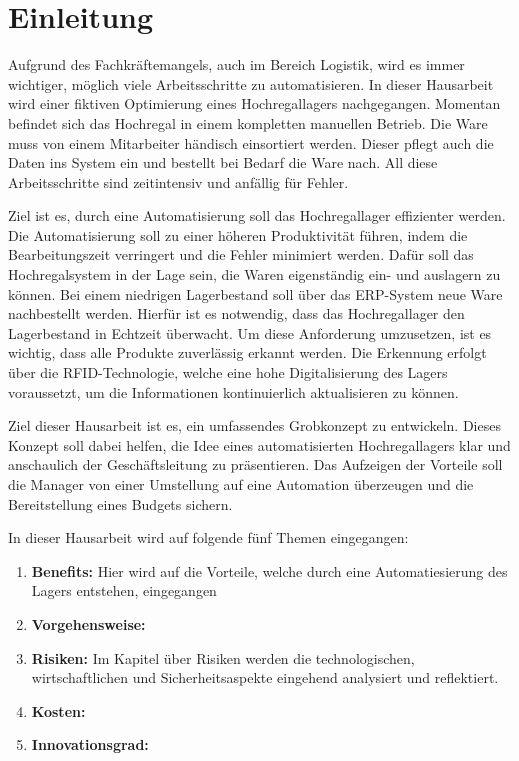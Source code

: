 \chapter{Einleitung}

Aufgrund des Fachkräftemangels, auch im Bereich Logistik, wird es immer wichtiger, möglich viele Arbeitsschritte zu automatisieren.
In dieser Hausarbeit wird einer fiktiven Optimierung eines Hochregallagers nachgegangen. 
Momentan befindet sich das Hochregal in einem kompletten manuellen Betrieb. Die Ware muss von einem Mitarbeiter händisch einsortiert werden. Dieser pflegt auch die Daten ins System ein und bestellt bei Bedarf die Ware nach.
All diese Arbeitsschritte sind zeitintensiv und anfällig für Fehler.

Ziel ist es, durch eine Automatisierung soll das Hochregallager effizienter werden. Die Automatisierung soll zu einer höheren Produktivität führen, indem die Bearbeitungszeit verringert und die Fehler minimiert werden. Dafür soll das Hochregalsystem in der Lage sein, die Waren eigenständig ein- und auslagern zu können. 
Bei einem niedrigen Lagerbestand soll über das ERP-System neue Ware nachbestellt werden. Hierfür ist es notwendig, dass das Hochregallager den Lagerbestand in Echtzeit überwacht. Um diese Anforderung umzusetzen, ist es wichtig, dass alle Produkte zuverlässig erkannt werden. Die Erkennung erfolgt über die RFID-Technologie, welche eine hohe Digitalisierung des Lagers voraussetzt, um die Informationen kontinuierlich aktualisieren zu können.

Ziel dieser Hausarbeit ist es, ein umfassendes Grobkonzept zu entwickeln. Dieses Konzept soll dabei helfen, die Idee eines automatisierten Hochregallagers klar und anschaulich der Geschäftsleitung zu präsentieren. 
Das Aufzeigen der Vorteile soll die Manager von einer Umstellung auf eine Automation überzeugen und die Bereitstellung eines Budgets sichern.

In dieser Hausarbeit wird auf folgende fünf Themen eingegangen:
\begin{enumerate}
	\item \textbf{Benefits: }Hier wird auf die Vorteile, welche durch eine Automatiesierung des Lagers entstehen, eingegangen
	\item \textbf{Vorgehensweise:}
	\item \textbf{Risiken:} Im Kapitel über Risiken werden die technologischen, wirtschaftlichen und Sicherheitsaspekte eingehend analysiert und reflektiert.
	\item \textbf{Kosten:}
	\item \textbf{Innovationsgrad:}
\end{enumerate}